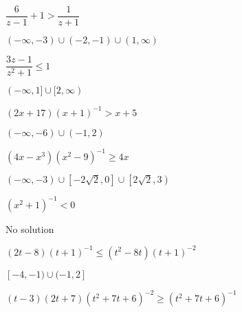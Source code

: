 \documentclass{ximera}
\begin{document}
\begin{problem}
\begin{question}
\end{question}

\begin{question}
$\dfrac{6}{z-1} + 1 > \dfrac{1}{z+1}$
\begin{solution}
$(-\infty, -3) \cup (-2, -1) \cup (1, \infty)$

\end{solution}

\end{question}

\begin{question}
$\dfrac{3z - 1}{z^{2} + 1} \leq 1$

\begin{solution}
$(-\infty, 1] \cup [2, \infty)$
\end{solution}

\end{question}

\begin{question}
$(2x+17)(x+1)^{-1} > x + 5$
\begin{solution}
$(-\infty, -6) \cup (-1, 2)$

\end{solution}

\end{question}

\begin{question}
$(4x-x^3)(x^{2} - 9)^{-1} \geq 4x$
\begin{solution}
$(-\infty, -3) \cup \left[-2\sqrt{2}, 0\right] \cup \left[2\sqrt{2}, 3\right)$
\end{solution}

\end{question}

\begin{question}
$(x^{2} + 1)^{-1} < 0$ 

\begin{solution}
No solution

\end{solution}

\end{question}

\begin{question}
$(2t-8)(t+1)^{-1} \leq (t^2-8t)(t+1)^{-2}$ %
\begin{solution}
$[-4, -1) \cup (-1,2]$
\end{solution}

\end{question}

\begin{question}
$(t-3)(2t+7)(t^2+7t+6)^{-2} \geq (t^2+7t+6)^{-1}$ %


\end{question}
\end{problem}
\end{document}
